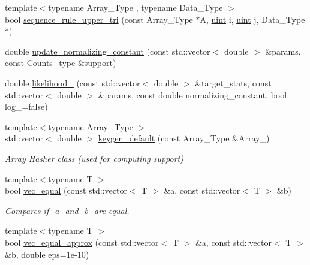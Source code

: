 \begin{DoxyCompactItemize}
\item 
{\footnotesize template$<$typename Array\+\_\+\+Type , typename Data\+\_\+\+Type $>$ }\\bool \hyperlink{namespacebarry_a1433970b34e5904f846a0aa41abef448}{sequence\+\_\+rule\+\_\+upper\+\_\+tri} (const Array\+\_\+\+Type $\ast$A, \hyperlink{namespacebarry_a11dfc53ddb4672278319aa04f1e09a6c}{uint} i, \hyperlink{namespacebarry_a11dfc53ddb4672278319aa04f1e09a6c}{uint} j, Data\+\_\+\+Type $\ast$)
\item 
double \hyperlink{namespacebarry_a822db820c95822d0e7a51728d9b9858d}{update\+\_\+normalizing\+\_\+constant} (const std\+::vector$<$ double $>$ \&params, const \hyperlink{namespacebarry_a3e2d8c3b6cf602107559d4237d9f1315}{Counts\+\_\+type} \&support)
\item 
double \hyperlink{namespacebarry_a1dcc0a46544cc9733ca8ee5619ef6d20}{likelihood\+\_\+} (const std\+::vector$<$ double $>$ \&target\+\_\+stats, const std\+::vector$<$ double $>$ \&params, const double normalizing\+\_\+constant, bool log\+\_\+=false)
\item 
{\footnotesize template$<$typename Array\+\_\+\+Type $>$ }\\std\+::vector$<$ double $>$ \hyperlink{namespacebarry_a22bfc7c4a1f5b5922edfd1101b8ffe3d}{keygen\+\_\+default} (const Array\+\_\+\+Type \&Array\+\_\+)
\begin{DoxyCompactList}\small\item\em Array Hasher class (used for computing support) \end{DoxyCompactList}\end{DoxyCompactItemize}
\textbf{ }\par
\begin{DoxyCompactItemize}
\item 
{\footnotesize template$<$typename T $>$ }\\bool \hyperlink{namespacebarry_afbdb85734a7793890ea4268ea114858e}{vec\+\_\+equal} (const std\+::vector$<$ T $>$ \&a, const std\+::vector$<$ T $>$ \&b)
\begin{DoxyCompactList}\small\item\em Compares if -\/a-\/ and -\/b-\/ are equal. \end{DoxyCompactList}\item 
{\footnotesize template$<$typename T $>$ }\\bool \hyperlink{namespacebarry_a24c4bd4a99dd82edf66c2d3b645dca08}{vec\+\_\+equal\+\_\+approx} (const std\+::vector$<$ T $>$ \&a, const std\+::vector$<$ T $>$ \&b, double eps=1e-\/10)
\end{DoxyCompactItemize}



